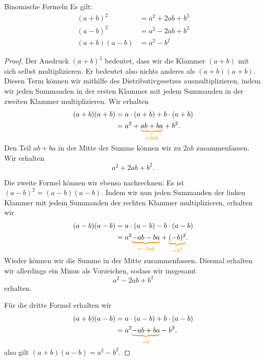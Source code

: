 \documentclass[../../main.tex]{subfiles}
\begin{document}
	\begin{theorem}{Binomische Formeln}
		Es gilt:
		\begin{align}
			\tag{1. Binomische Formel}
			(a+b)^2&=a^2+2ab+b^2\\
			\tag{2. Binomische Formel}
			(a-b)^2&=a^2-2ab+b^2\\
			\tag{3. Binomische Formel}
			(a+b)(a-b)&=a^2-b^2
		\end{align}
	\end{theorem}
	\begin{proof}
		Der Ausdruck $(a+b)^2$ bedeutet, dass wir die Klammer $(a+b)$ mit sich selbst multiplizieren. Er bedeutet also nichts anderes als $(a+b)(a+b)$. Diesen Term können wir mithilfe des Distributivgesetzes ausmultiplizieren, indem wir jeden Summanden in der ersten Klammer mit jedem Summanden in der zweiten Klammer multiplizieren. Wir erhalten
		\begin{align*}
			(a+b)(a+b)&=a\cdot (a+b)+b\cdot (a+b)\\
			&=a^2+\colorbrace{ab+ba}{=2ab}+b^2.
		\end{align*}
		Den Teil $ab+ba$ in der Mitte der Summe können wir zu $2ab$ zusammenfassen. Wir erhalten \[a^2+2ab+b^2.\]

		Die zweite Formel können wir ebenso nachrechnen: Es ist $(a-b)^2=(a-b)(a-b)$. Indem wir nun jeden Summanden der linken Klammer mit jedem Summanden der rechten Klammer multiplizieren, erhalten wir
		\begin{align*}
			(a-b)(a-b)&=a\cdot (a-b)-b\cdot (a-b)\\&=a^2\colorbrace{-ab-ba}{=-2ab}+\colorbrace{(-b)^2}{=b^2}.
		\end{align*}
		Wieder können wir die Summe in der Mitte zusammenfassen. Diesmal erhalten wir allerdings ein Minus als Vorzeichen, sodass wir insgesamt \[a^2-2ab+b^2\] erhalten.

		Für die dritte Formel erhalten wir 
		\begin{align*}
			(a+b)(a-b)&=a\cdot (a-b)+b\cdot (a-b)\\
			&=a^2\colorbrace{-ab+ba}{=0}-b^2,
		\end{align*}
		also gilt $(a+b)(a-b)=a^2-b^2$.
	\end{proof}
\end{document}
